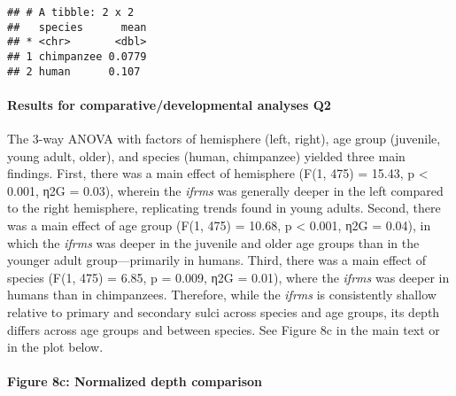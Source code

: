\documentclass[
]{article}
\newenvironment{Shaded}{\begin{snugshade}}{\end{snugshade}}
\newcommand{\CommentTok}[1]{\textcolor[rgb]{0.56,0.35,0.01}{\textit{#1}}}
\newcommand{\DataTypeTok}[1]{\textcolor[rgb]{0.13,0.29,0.53}{#1}}
\newcommand{\KeywordTok}[1]{\textcolor[rgb]{0.13,0.29,0.53}{\textbf{#1}}}
\newcommand{\NormalTok}[1]{#1}
\newcommand{\OperatorTok}[1]{\textcolor[rgb]{0.81,0.36,0.00}{\textbf{#1}}}
\newcommand{\StringTok}[1]{\textcolor[rgb]{0.31,0.60,0.02}{#1}}
\begin{document}
\begin{verbatim}
## # A tibble: 2 x 2
##   species      mean
## * <chr>       <dbl>
## 1 chimpanzee 0.0779
## 2 human      0.107
\end{verbatim}

\hypertarget{results-for-comparativedevelopmental-analyses-q2}{%
\paragraph{Results for comparative/developmental analyses
Q2}\label{results-for-comparativedevelopmental-analyses-q2}}

The 3-way ANOVA with factors of hemisphere (left, right), age group
(juvenile, young adult, older), and species (human, chimpanzee) yielded
three main findings. First, there was a main effect of hemisphere (F(1,
475) = 15.43, p \textless{} 0.001, η2G = 0.03), wherein the \emph{ifrms}
was generally deeper in the left compared to the right hemisphere,
replicating trends found in young adults. Second, there was a main
effect of age group (F(1, 475) = 10.68, p \textless{} 0.001, η2G =
0.04), in which the \emph{ifrms} was deeper in the juvenile and older
age groups than in the younger adult group---primarily in humans. Third,
there was a main effect of species (F(1, 475) = 6.85, p = 0.009, η2G =
0.01), where the \emph{ifrms} was deeper in humans than in chimpanzees.
Therefore, while the \emph{ifrms} is consistently shallow relative to
primary and secondary sulci across species and age groups, its depth
differs across age groups and between species. See Figure 8c in the main
text or in the plot below.

\hypertarget{figure-8c-normalized-depth-comparison}{%
\paragraph{Figure 8c: Normalized depth
comparison}\label{figure-8c-normalized-depth-comparison}}

\begin{Shaded}
\end{Shaded}
\end{document}
